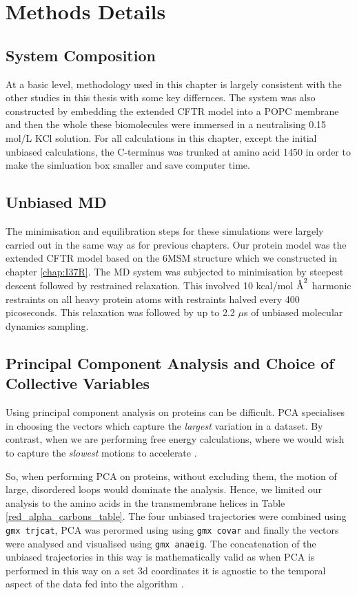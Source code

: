 \section{Methods Details}
\subsection{System Composition}
At a basic level, methodology used in this chapter is largely consistent with the other studies in this thesis with some key differnces. The system was also constructed by embedding the extended CFTR model into a POPC membrane and then the whole these biomolecules were immersed in a neutralising 0.15 mol/L KCl solution. For all calculations in this chapter, except the initial unbiased calculations, the C-terminus was trunked at amino acid 1450 in order to make the simluation box smaller and save computer time.

\subsection{Unbiased MD }
The minimisation and equilibration steps for these simulations were largely carried out in the same way as for previous chapters. Our protein model was the extended CFTR model based on the 6MSM structure \cite{zhang2018} which we constructed in chapter \ref{chap:I37R}. The MD system was subjected to minimisation by steepest descent followed by restrained relaxation. This involved 10 kcal/mol $\textup{\AA}^2$ harmonic restraints on all heavy protein atoms with restraints halved every 400 picoseconds. This relaxation was followed by up to 2.2 $\mu$s of unbiased molecular dynamics sampling.

\subsection {Principal Component Analysis and Choice of Collective Variables}
\label {supp_cv_choice}
Using principal component analysis on proteins can be difficult. PCA specialises in choosing the vectors which capture the \textit{largest} variation in a dataset. By contrast, when we are performing free energy calculations, where we would wish to capture the \textit{slowest} motions to accelerate \cite{noe2001}. 

So, when performing PCA on proteins, without excluding them, the motion of large, disordered loops would dominate the analysis. Hence, we limited our analysis to the amino acids in the transmembrane helices in Table \ref{red_alpha_carbons_table}. The four unbiased trajectories were combined using \verb_gmx trjcat_, PCA was perormed using using \verb_gmx covar_ and finally the vectors were analysed and visualised using \verb_gmx anaeig_. The concatenation of the unbiased trajectories in this way is mathematically valid as when PCA is performed in this way on a set 3d coordinates it is agnostic to the temporal aspect of the data fed into the algorithm \cite{}.


